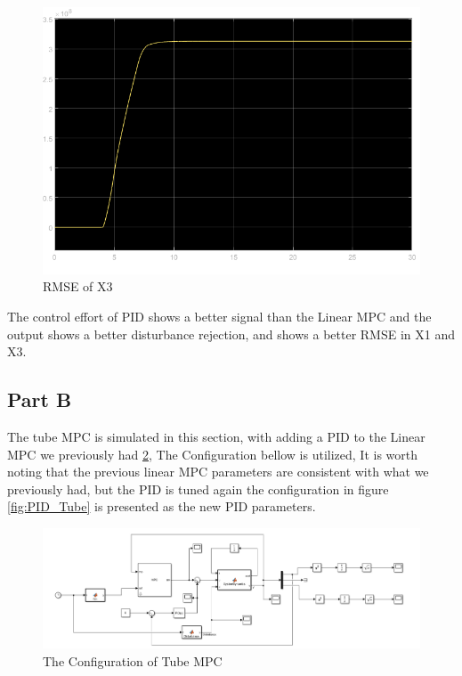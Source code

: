 \documentclass{article}
\begin{document}
\begin{figure}
    \centering
    \includegraphics[width=\linewidth]{images/PID_RMSE_X2.png}
    \caption{RMSE of X3}
    \label{fig2}
\end{figure}

The control effort of PID shows a better signal than the Linear MPC and the output shows a better disturbance rejection, and shows a better RMSE in X1 and X3.

\subsection{Part B}
The tube MPC is simulated in this section, with adding a PID to the Linear MPC we previously had \ref{fig:Tube}, The Configuration bellow is utilized, It is worth noting that the previous linear MPC parameters are consistent with what we previously had, but the PID is tuned again the configuration in figure \ref{fig:PID_Tube} is presented as the new PID parameters.

\begin{figure}
    \centering
    \includegraphics[width=\linewidth]{images/Tube_MPC_Configuration.png}
    \caption{The Configuration of Tube MPC}
    \label{fig:Tube}
\end{figure}
\end{document}
